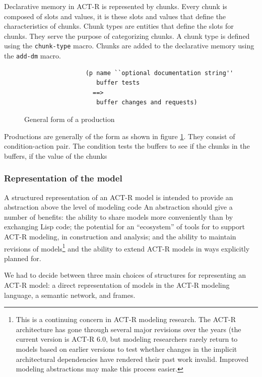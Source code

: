 Declarative memory in ACT-R is represented by
chunks\cite{actr-tut}. Every chunk is composed of slots and values, it
is these slots and values that define the characteristics of
chunks. Chunk types are entities that define the slots for
chunks. They serve the purpose of categorizing
chunks\cite{actr-tut}. A chunk type is defined using the
\texttt{chunk-type} macro. Chunks are added to the declarative memory
using the \texttt{add-dm} macro. 


\begin{figure}
\label{production_fig}
\centering
\begin{center}
\begin{verbatim}
                 (p name ``optional documentation string''
                    buffer tests
                   ==>
                    buffer changes and requests)
\end{verbatim}
\end{center}
\caption{General form of a production\cite{actr-tut}}
\end{figure}

Productions are generally of the form as shown in figure
\ref{production_fig}. They consist of condition-action pair. The
condition tests the buffers to see if the chunks in the buffers, if
the value of the chunks 

\subsubsection{Representation of the model}
A structured representation of an ACT-R model is intended to provide
an abstraction above the level of modeling code An abstraction should
give a number of benefits: the ability to share models more
conveniently than by exchanging Lisp code; the potential for an
``ecosystem'' of tools for to support ACT-R modeling, in construction
and analysis; and the ability to maintain revisions of
models\footnote{This is a continuing concern in ACT-R modeling
  research.  The ACT-R architecture has gone through several major
  revisions over the years (the current version is ACT-R 6.0, but
  modeling researchers rarely return to models based on earlier
  versions to test whether changes in the implicit architectural
  dependencies have rendered their past work invalid.  Improved
  modeling abstractions may make this process easier.}
%
and the ability to extend ACT-R models in ways explicitly planned for.

We had to decide between three main choices of structures for
representing an ACT-R model: a direct representation of models in the
ACT-R modeling language, a semantic network, and frames.

